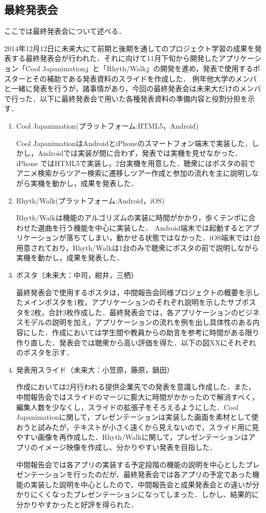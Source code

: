 \subsection{最終発表会}
\par
ここでは最終発表会について述べる．
\par
 2014年12月12日に未来大にて前期と後期を通してのプロジェクト学習の成果を発表する最終発表会が行われた．それに向けて11月下旬から開発したアプリケーション「Cool Japanimation」と「Rhyth/Walk」の開発を進め，発表で使用するポスターとその補助である発表資料のスライドを作成した．
例年他大学のメンバと一緒に発表を行うが，諸事情があり，今回の最終発表会は未来大だけのメンバで行った．以下に最終発表会で用いた各種発表資料の準備内容と役割分担を示す．
\begin{enumerate}
\item Cool Japanimation(プラットフォーム:HTML5，Android)
\par
 Cool JapanimationはAndroidとiPhoneのスマートフォン端末で実装した．しかし，Androidでは実装が間に合わず，発表では実機を見せなかった．iPhone ではHTML5で実装し，2台実機を用意した．聴衆にはポスタの前でアニメ検索からツアー検索に遷移しツアー作成と参加の流れを主に説明しながら実機を動かし，成果を発表した．
\par
\item Rhyth/Walk(プラットフォーム:Android，iOS)
\par
 Rhyth/Walkは機能のアルゴリズムの実装に時間がかかり，歩くテンポに合わせた選曲を行う機能を中心に実装した． Android端末では起動するとアプリケーションが落ちてしまい，動かせる状態ではなかった．iOS端末では1台用意されており，Rhyth/Walkは1台のみで聴衆にポスタの前で説明しながら実機を動かし，成果を発表した．


\item ポスタ（未来大：中司，紺井，三栖）
\par
 最終発表会で使用するポスタは，中間報告会同様プロジェクトの概要を示したメインポスタを1枚，アプリケーションのそれぞれ説明を示したサブポスタを2枚，合計3枚作成した．最終発表会では，各アプリケーションのビジネスモデルの説明を加え，アプリケーションの流れを例を出し具体性のある内容にした．作成においては学生間や教員からの助言を参考に時間がある限り作り直した．発表会では聴衆から高い評価を得た．以下の図XXにそれぞれのポスタを示す． 
\item 発表用スライド（未来大：小笠原，藤原，鍋田）
\par
作成においては2月行われる提供企業先での発表を意識し作成した．また，中間報告会ではスライドのマージに膨大に時間がかかったので解消すべく，編集人数を少なくし，スライドの拡張子をそろえるようにした．Cool Japanimationに関して，プレゼンテーションは実装した画面を素材として使おうと試みたが，テキストが小さく遠くから見えないので，スライド用に見やすい画像を再作成した．Rhyth/Walkに関して，プレゼンテーションはアプリのイメージ映像を作成し、分かりやすい発表を目指した．
\par
中間報告会では各アプリの実装する予定段階の機能の説明を中心としたプレゼンテーションを行ったのだが、最終発表会では各アプリの予定であった機能の実装した説明を中心としたので、中間報告会と成果発表会との違いが分かりにくくなったプレゼンテーションになってしまった．しかし、結果的に分かりやすかったと好評を得られた．


\end{enumerate}
